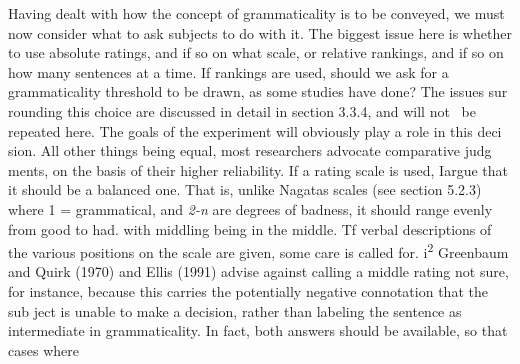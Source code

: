 \begin{styleStandard}
Having dealt with how the concept of grammaticality is to be conveyed, we must now consider what to ask subjects to do with it. The biggest issue here is whether to use absolute ratings, and if so on what scale, or relative rankings, and if so on how many sentences at a time. If rankings are used, should we ask for a grammaticality threshold to be drawn, as some studies have done? The issues sur\- rounding this choice are discussed in detail in section 3.3.4, and will not \ be repeated here. The goals of the experiment will obviously play a role in this deci\- sion. All other things being equal, most researchers advocate comparative judg\- ments, on the basis of their higher reliability. If a rating scale is used, Iargue that it should be a balanced one. That is, unlike Nagata{\textquotesingle}s scales (see section 5.2.3) where 1 = grammatical, and \textit{2-n}\textit{ }are degrees of badness, it should range evenly from good to had. with middling being in the middle. Tf verbal descriptions of the various positions on the scale are given, some care is called for. i\textsuperscript{2}\textsuperscript{ }Greenbaum and Quirk (1970) and Ellis (1991) advise against calling a middle rating {\textquotedbl}not sure,{\textquotedbl} for instance, because this carries the potentially negative connotation that the sub\- ject is unable to make a decision, rather than labeling the sentence as intermediate in grammaticality. In fact, both answers should be available, so that cases where
\end{styleStandard}


